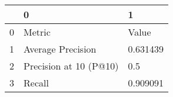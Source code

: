\begin{tabular}{lll}
\toprule
{} &                       0 &         1 \\
\midrule
0 &                  Metric &     Value \\
1 &       Average Precision &  0.631439 \\
2 &  Precision at 10 (P@10) &       0.5 \\
3 &                  Recall &  0.909091 \\
\bottomrule
\end{tabular}

